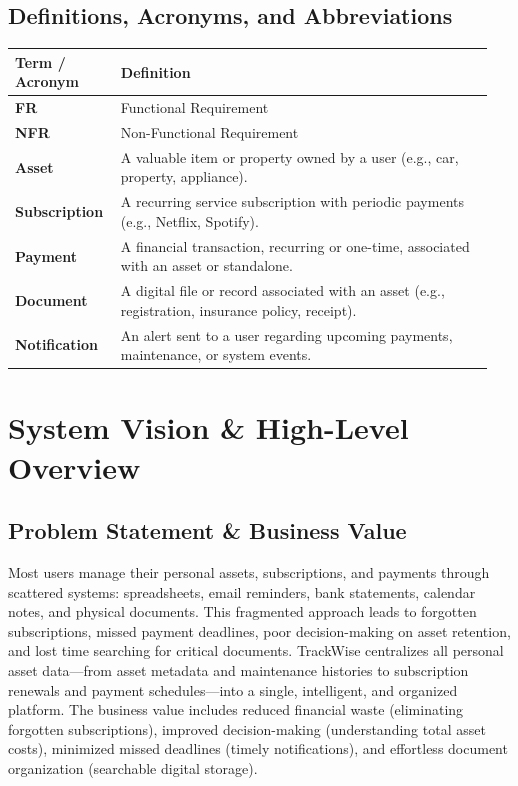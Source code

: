 \documentclass[11pt, a4paper]{article}
\newcommand{\reqid}[1]{\textbf{\color{PrimaryColor}#1}}
\begin{document}
	\subsection{Definitions, Acronyms, and Abbreviations}
	\begin{center}
		\small
		\begin{tabular}{p{0.2\linewidth} p{0.75\linewidth}}
			\toprule
			\textbf{Term / Acronym} & \textbf{Definition} \\
			\midrule
			\reqid{FR} & Functional Requirement \\
			\reqid{NFR} & Non-Functional Requirement \\
			\reqid{Asset} & A valuable item or property owned by a user (e.g., car, property, appliance). \\
			\reqid{Subscription} & A recurring service subscription with periodic payments (e.g., Netflix, Spotify). \\
			\reqid{Payment} & A financial transaction, recurring or one-time, associated with an asset or standalone. \\
			\reqid{Document} & A digital file or record associated with an asset (e.g., registration, insurance policy, receipt). \\
			\reqid{Notification} & An alert sent to a user regarding upcoming payments, maintenance, or system events. \\
			\bottomrule
		\end{tabular}
	\end{center}
	
	
	\section{System Vision \& High-Level Overview}
	\subsection{Problem Statement \& Business Value}
	Most users manage their personal assets, subscriptions, and payments through scattered systems: spreadsheets, email reminders, bank statements, calendar notes, and physical documents. This fragmented approach leads to forgotten subscriptions, missed payment deadlines, poor decision-making on asset retention, and lost time searching for critical documents. TrackWise centralizes all personal asset data—from asset metadata and maintenance histories to subscription renewals and payment schedules—into a single, intelligent, and organized platform. The business value includes reduced financial waste (eliminating forgotten subscriptions), improved decision-making (understanding total asset costs), minimized missed deadlines (timely notifications), and effortless document organization (searchable digital storage).
	
\end{document}
